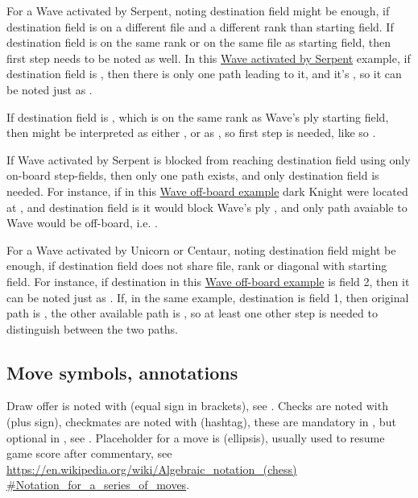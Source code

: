 For a Wave activated by Serpent, noting destination field might be enough, if destination field is on a different file
and a different rank than starting field. If destination field is on the same rank or on the same file as starting field,
then first step needs to be noted as well. In this
\hyperref[fig:scn_tr_15_serpent_activated_wave_ply]{Wave activated by Serpent} example, if destination field is ,
then there is only one path leading to it, and it's , so it can be noted just as
.

If destination field is , which is on the same rank as Wave's ply starting field, then  might be
interpreted as either , or as , so first step is needed, like so
.

If Wave activated by Serpent is blocked from reaching destination field using only on-board step-fields, then only one
path exists, and only destination field is needed. For instance, if in this
\hyperref[fig:scn_tr_16_wave_out_of_board]{Wave off-board example} dark Knight were located at , and destination
field is  it would block Wave's ply , and only path avaiable to Wave would be
off-board, i.e. .

For a Wave activated by Unicorn or Centaur, noting destination field might be enough, if destination field does not share
file, rank or diagonal with starting field. For instance, if destination in this
\hyperref[fig:scn_mv_26_wave_off_board]{Wave off-board example} is field 2, then it can be noted just as .
If, in the same example, destination is field 1, then original path is , the other available
path is , so at least one other step is needed to distinguish between the two paths.

\subsection*{Move symbols, annotations}
\label{sec:Appendix/Notation/Move symbols, annotations}

Draw offer is noted with \alg{(=)} (equal sign in brackets), see . Checks are noted with \alg{+} (plus sign),
checkmates are noted with \alg{\#} (hashtag), these are mandatory in , but optional in , see
. Placeholder for a move is  (ellipsis), usually used to resume game score after commentary, see\\
\href{https://en.wikipedia.org/wiki/Algebraic\_notation\_(chess)\#Notation\_for\_a\_series\_of\_moves}{https://en.wikipedia.org/wiki/Algebraic\_notation\_(chess)\\
\#Notation\_for\_a\_series\_of\_moves}.


